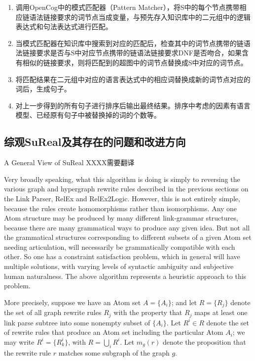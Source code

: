 \begin{itemize}
\begin{enumerate}
\item 调用OpenCog中的模式匹配器（Pattern Matcher），将S中的每个节点携带相应链语法链接要求的词节点当成变量，与预先存入知识库中的二元组中的逻辑表达式和句法表达式进行匹配。

\item  当模式匹配器在知识库中搜索到对应的匹配后，检查其中的词节点携带的链语法链接要求是否与S中对应节点携带的链语法链接要求DNF是否吻合，如果含有相似的链接要求，则将匹配到的超图中的词节点替换成S中对应的词节点。

\item 将匹配结果在二元组中对应的语言表达式中的相应词替换成新的词节点对应的词后，生成句子。

\item 对上一步得到的所有句子进行排序后输出最终结果。排序中考虑的因素有语言模型、已经原有句子中被替换掉的词的个数等。

\end{enumerate}
\end{itemize}


\subsection{综观SuReal及其存在的问题和改进方向}{A General View of SuReal}
XXXX需要翻译

Very broadly speaking, what this algorithm is doing is simply to reversing the various graph and hypergraph rewrite rules described in the previous sections on the Link Parser, RelEx and RelEx2Logic.   However, this is not entirely simple, because the rules create homomorphisms rather than isomorphisms.  Any one Atom structure may be produced by many different link-grammar structures, because there are many grammatical ways to produce any given idea.   But not all the grammatical structures corresponding to different subsets of a given Atom set needing articulation, will necessarily be grammatically compatible with each other.  So one has a constraint satisfaction problem, which in general will have multiple solutions, with varying levels of syntactic ambiguity and subjective human naturalness.   The above algorithm represents a heuristic approach to this problem.

More precisely, suppose we have an Atom set $A = \{A_i\}$; and let $R = \{ R_{j} \}$ denote the set of all graph rewrite rules $R_j$ with the property that $R_j$ maps at least one link parse subtree into some nonempty subset of $\{A_i\}$.  Let $R^i \in R$ denote the set of rewrite rules that produce an Atom set including the particular Atom $A_i$; we may write $R^i = \{R^i_k\}$, with $R = \bigcup_i R^i$.   Let $m_g(r )$ denote the proposition that the rewrite rule $r$ matches some subgraph of the graph $g$.

